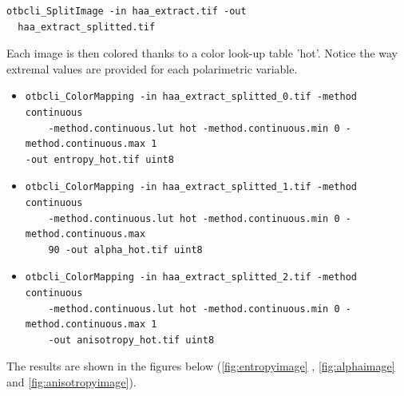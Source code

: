 \begin{verbatim} 
otbcli_SplitImage -in haa_extract.tif -out
  haa_extract_splitted.tif 
\end{verbatim}

Each image is then colored thanks to a color look-up table 'hot'. 
Notice the way extremal values are provided for each polarimetric variable.

\begin{itemize}
\item 
\begin{verbatim} 
otbcli_ColorMapping -in haa_extract_splitted_0.tif -method continuous 
    -method.continuous.lut hot -method.continuous.min 0 -method.continuous.max 1
-out entropy_hot.tif uint8 
\end{verbatim}
									  
\item 
\begin{verbatim} 
otbcli_ColorMapping -in haa_extract_splitted_1.tif -method continuous 
    -method.continuous.lut hot -method.continuous.min 0 -method.continuous.max
    90 -out alpha_hot.tif uint8 
\end{verbatim}
									  
\item 
\begin{verbatim} 
otbcli_ColorMapping -in haa_extract_splitted_2.tif -method continuous 
    -method.continuous.lut hot -method.continuous.min 0 -method.continuous.max 1
    -out anisotropy_hot.tif uint8 
\end{verbatim}
\end{itemize}

The results are shown in the figures below (\ref{fig:entropyimage} , \ref{fig:alphaimage} and \ref{fig:anisotropyimage}).

